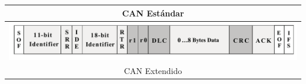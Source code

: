 \begin{frame}
\begin{columns}[T]
\begin{column}{.5\textwidth}
\begin{table}[]
\begin{tabular}{c}
					CAN Estándar \\ \hline
					\includegraphics[scale=0.1]{images/ExtendedCAN.png} \\
					CAN Extendido \\
					\hline				
				\end{tabular}
			\end{table}
	    \end{column}
	\end{columns}
\end{frame}